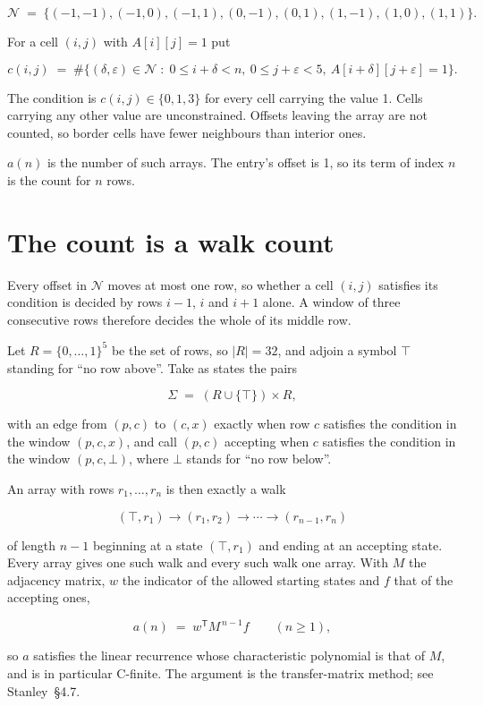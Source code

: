 \documentclass[11pt]{article}
\theoremstyle{definition}
\begin{document}
\[\mathcal{N} \;=\; \{(-1,-1), (-1,0), (-1,1), (0,-1), (0,1), (1,-1), (1,0), (1,1)\}.\]

For a cell $(i,j)$ with $A[i][j] = 1$ put

\[c(i,j) \;=\; \#\bigl\{(\delta,\varepsilon)\in\mathcal{N} \;:\; 0\le i+\delta<n,\ 0\le j+\varepsilon<5,\ A[i+\delta][j+\varepsilon] = 1\bigr\}.\]

The condition is $c(i,j) \in \{0, 1, 3\}$ for every cell carrying the value 1. Cells carrying any other value are unconstrained. Offsets leaving the array are not counted, so border cells have fewer neighbours than interior ones.

$a(n)$ is the number of such arrays. The entry's offset is 1, so its term of index $n$ is the count for $n$ rows.

\section{The count is a walk count}

Every offset in $\mathcal{N}$ moves at most one row, so whether a cell $(i,j)$ satisfies its condition is decided by rows $i-1$, $i$ and $i+1$ alone. A window of three consecutive rows therefore decides the whole of its middle row.

Let $R = \{0,\dots,1\}^{5}$ be the set of rows, so $|R| = 32$, and adjoin a symbol $\top$ standing for ``no row above''. Take as states the pairs

\[\Sigma \;=\; (R \cup \{\top\}) \times R,\]

with an edge from $(p,c)$ to $(c,x)$ exactly when row $c$ satisfies the condition in the window $(p,c,x)$, and call $(p,c)$ accepting when $c$ satisfies the condition in the window $(p,c,\bot)$, where $\bot$ stands for ``no row below''.

An array with rows $r_1,\dots,r_n$ is then exactly a walk

\[(\top,r_1) \to (r_1,r_2) \to \cdots \to (r_{n-1},r_n)\]

of length $n-1$ beginning at a state $(\top,r_1)$ and ending at an accepting state. Every array gives one such walk and every such walk one array. With $M$ the adjacency matrix, $w$ the indicator of the allowed starting states and $f$ that of the accepting ones,

\[a(n) \;=\; w^{\mathsf T} M^{\,n-1} f \qquad (n \ge 1),\]

so $a$ satisfies the linear recurrence whose characteristic polynomial is that of $M$, and is in particular C-finite. The argument is the transfer-matrix method; see Stanley~\S4.7.
\end{document}
